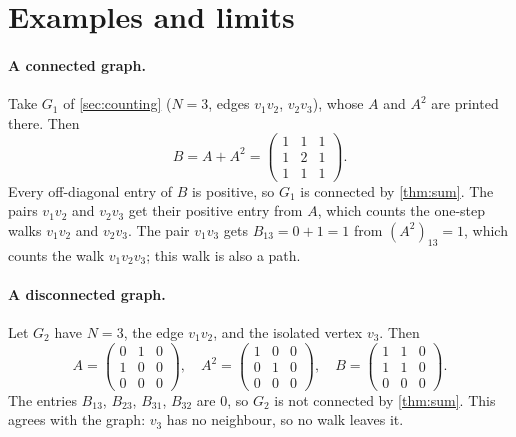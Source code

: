 \section{Examples and limits}\label{sec:example}

\paragraph{A connected graph.} Take $G_1$ of \cref{sec:counting} ($N=3$, edges $v_1v_2$, $v_2v_3$), whose $A$ and $A^2$ are printed there. Then
\[
B=A+A^2=\begin{pmatrix}1&1&1\\1&2&1\\1&1&1\end{pmatrix}.
\]
Every off-diagonal entry of $B$ is positive, so $G_1$ is connected by \cref{thm:sum}. The pairs $v_1v_2$ and $v_2v_3$ get their positive entry from $A$, which counts the one-step walks $v_1v_2$ and $v_2v_3$. The pair $v_1v_3$ gets $B_{13}=0+1=1$ from $(A^2)_{13}=1$, which counts the walk $v_1v_2v_3$; this walk is also a path.

\paragraph{A disconnected graph.} Let $G_2$ have $N=3$, the edge $v_1v_2$, and the isolated vertex $v_3$. Then
\[
A=\begin{pmatrix}0&1&0\\1&0&0\\0&0&0\end{pmatrix},\quad
A^2=\begin{pmatrix}1&0&0\\0&1&0\\0&0&0\end{pmatrix},\quad
B=\begin{pmatrix}1&1&0\\1&1&0\\0&0&0\end{pmatrix}.
\]
The entries $B_{13}$, $B_{23}$, $B_{31}$, $B_{32}$ are $0$, so $G_2$ is not connected by \cref{thm:sum}. This agrees with the graph: $v_3$ has no neighbour, so no walk leaves it.

